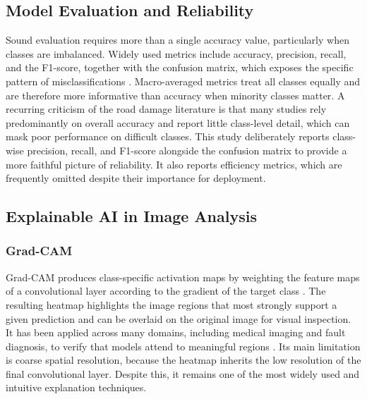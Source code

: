 \documentclass[preprint,12pt]{elsarticle}
\begin{document}
\subsection{Model Evaluation and Reliability}

Sound evaluation requires more than a single accuracy value, particularly when classes are imbalanced.
Widely used metrics include accuracy, precision, recall, and the F1-score, together with the confusion matrix, which exposes the specific pattern of misclassifications \cite{nguyen2023survey}.
Macro-averaged metrics treat all classes equally and are therefore more informative than accuracy when minority classes matter.
A recurring criticism of the road damage literature is that many studies rely predominantly on overall accuracy and report little class-level detail, which can mask poor performance on difficult classes.
This study deliberately reports class-wise precision, recall, and F1-score alongside the confusion matrix to provide a more faithful picture of reliability.
It also reports efficiency metrics, which are frequently omitted despite their importance for deployment.

\subsection{Explainable AI in Image Analysis}

\subsubsection{Grad-CAM}

Grad-CAM produces class-specific activation maps by weighting the feature maps of a convolutional layer according to the gradient of the target class \cite{selvaraju2017gradcam}.
The resulting heatmap highlights the image regions that most strongly support a given prediction and can be overlaid on the original image for visual inspection.
It has been applied across many domains, including medical imaging and fault diagnosis, to verify that models attend to meaningful regions \cite{li2023multilayer, dhar2023challenges}.
Its main limitation is coarse spatial resolution, because the heatmap inherits the low resolution of the final convolutional layer.
Despite this, it remains one of the most widely used and intuitive explanation techniques.
\end{document}
